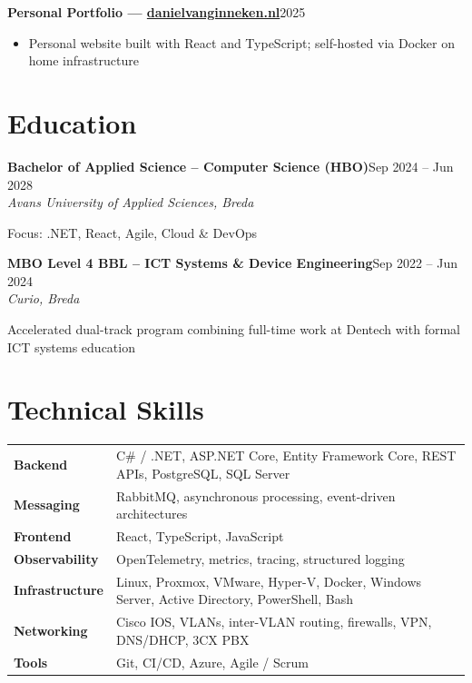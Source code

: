 \documentclass[a4paper,10pt]{article}
\newcommand{\cventry}[4]{%
  {\textbf{#1}}\hfill{\small\color{lightgray}#2}\\
  {\textit{#3}}\hfill{\small\color{lightgray}#4}\vspace{2pt}%
}
\newcommand{\cvsimple}[2]{%
  {\textbf{#1}}\hfill{\small\color{lightgray}#2}\vspace{1pt}%
}
\begin{document}
\vspace{4pt}

\cvsimple{Personal Portfolio --- \href{https://danielvanginneken.nl}{danielvanginneken.nl}}{2025}
\begin{itemize}
  \item Personal website built with React and TypeScript; self-hosted via Docker on home infrastructure
\end{itemize}

\section{Education}

\cventry{Bachelor of Applied Science -- Computer Science (HBO)}{Sep 2024 -- Jun 2028}%
        {Avans University of Applied Sciences, Breda}{}
\vspace{-1pt}
{\small Focus: .NET, React, Agile, Cloud \& DevOps}

\vspace{4pt}

\cventry{MBO Level 4 BBL -- ICT Systems \& Device Engineering}{Sep 2022 -- Jun 2024}%
        {Curio, Breda}{}
\vspace{-1pt}
{\small Accelerated dual-track program combining full-time work at Dentech with formal ICT systems education}

\section{Technical Skills}

\begin{tabularx}{\textwidth}{@{}>{\bfseries\small}l@{\hspace{8pt}}X@{}}
Backend         & C\# / .NET, ASP.NET Core, Entity Framework Core, REST APIs, PostgreSQL, SQL Server \\[3pt]
Messaging       & RabbitMQ, asynchronous processing, event-driven architectures \\[3pt]
Frontend        & React, TypeScript, JavaScript \\[3pt]
Observability   & OpenTelemetry, metrics, tracing, structured logging \\[3pt]
Infrastructure  & Linux, Proxmox, VMware, Hyper-V, Docker, Windows Server, Active Directory, PowerShell, Bash \\[3pt]
Networking      & Cisco IOS, VLANs, inter-VLAN routing, firewalls, VPN, DNS/DHCP, 3CX PBX \\[3pt]
Tools           & Git, CI/CD, Azure, Agile / Scrum \\
\end{tabularx}
\end{document}
